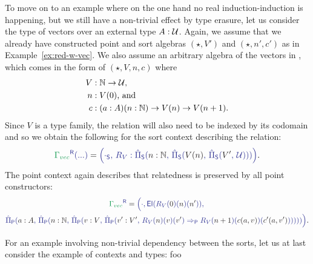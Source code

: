 \begin{example}[Vectors]
To move on to an example where on the one hand no real induction-induction is
happening, but we still have a non-trivial effect by type erasure, let us
consider the type of vectors over an external type $A : \mathcal{U}$.
Again, we assume that we already have constructed point and sort algebras
$(\star, V')$ and $(\star, n', c')$ as in Example~\ref{ex:red-w-vec}.
We also assume an arbitrary algebra of the vectors in , which
comes in the form of $(\star, V, n, c)$ where
\begin{align*}
V &: \mathbb{N} \to \mathcal{U} \text{,} \\
n &: V(0) \text{, and} \\
c &: (a : A)(n : \mathbb{N}) \to V(n) \to V(n + 1) \text{.}
\end{align*}
Since $V$ is a type family, the relation will also need to be indexed by its codomain
and so we obtain the following for the sort context describing the relation:
\begin{equation*}
\tqm{\grm{\Gamma_{vec}}^\RR(...)} =
  \tqm{\Bigl( \cdot_\Sc ,\, R_V : \ExtPiS{n : \N}{\ExtPiS{V(n)}{\ExtPiS{V'}{\UU}}} \Bigr)} \text{.}
\end{equation*}
The point context again describes that relatedness is preserved by all point
constructors:
\begin{equation*}
\begin{gathered}
\tqm{\grm{\Gamma_{vec}}^\RR}
  = \tqm{ \Bigl( \cdot ,\,} \tqm{ \El(R_V(\blm{0})(\blm{n})(\blm{n'})) ,\, } \\
 \tqm{ \ExtPiP{a : A}{\ExtPiP{n : \N}{\ExtPiP{v : V}{\ExtPiP{v' : V'}{R_V(\blm{n})(\blm{v})(\blm{v'})
     \Rightarrow_\Pc R_V(\blm{n+1})(\blm{c(a,v)})(\blm{c'(a,v')})}}}} \Bigr) } \text{.} %
\end{gathered}
\end{equation*}
\end{example}

\begin{example}
For an example involving non-trivial dependency between the sorts, let us
at last consider the example of contexts and types:
foo
\end{example}

